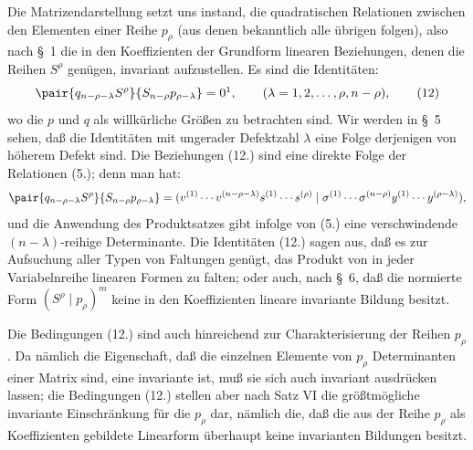 Die Matrizendarstellung setzt uns instand, die quadratischen Relationen zwischen den Elementen einer Reihe $p_\rho$ (aus denen bekanntlich alle übrigen folgen), also nach \S\ 1 die in den Koeffizienten der Grundform linearen Beziehungen, denen die Reihen $S^\rho$ genügen, invariant aufzustellen. Es sind die Identitäten:
\begin{equation}
 \pair{q_{n-\rho-\lambda}S^\rho}{S_{n-\rho}p_{\rho-\lambda}}=0\footnotemark,
 \qquad (\lambda=1,2,\ldots,\rho,n-\rho),
\tag{12}
\end{equation}
wo die $p$ und $q$ als willkürliche Größen zu betrachten sind. Wir werden in \S\ 5 sehen, daß die Identitäten mit ungerader Defektzahl $\lambda$ eine Folge derjenigen von höherem Defekt sind. Die Beziehungen (12.) sind eine direkte Folge der Relationen (5.); denn man hat:
\[
 \pair{q_{n-\rho-\lambda}S^\rho}{S_{n-\rho}p_{\rho-\lambda}}
 =(v^{(1)}\cdots v^{(n-\rho-\lambda)}s^{(1)}\cdots s^{(\rho)}\mid \sigma^{(1)}\cdots\sigma^{(n-\rho)}y^{(1)}\cdots y^{(\rho-\lambda)}),
\]
und die Anwendung des Produktsatzes gibt infolge von (5.) eine verschwindende $(n-\lambda)$-reihige Determinante. Die Identitäten (12.) sagen aus, daß es zur Aufsuchung aller Typen von Faltungen genügt, das Produkt von in jeder Variabelnreihe linearen Formen zu falten; oder auch, nach \S\ 6, daß die normierte Form $(S^\rho\mid p_\rho)^m$ keine in den Koeffizienten lineare invariante Bildung besitzt.

Die Bedingungen (12.) sind auch hinreichend zur Charakterisierung der Reihen $p_\rho$. Da nämlich die Eigenschaft, daß die einzelnen Elemente von $p_\rho$ Determinanten einer Matrix sind, eine invariante ist, muß sie sich auch invariant ausdrücken lassen; die Bedingungen (12.) stellen aber nach Satz VI die größtmögliche invariante Einschränkung für die $p_\rho$ dar, nämlich die, daß die aus der Reihe $p_\rho$ als Koeffizienten gebildete Linearform überhaupt keine invarianten Bildungen besitzt.

